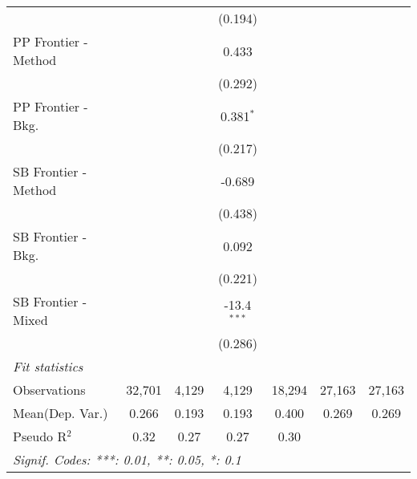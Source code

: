 \begin{tabular}{lcccccc}
                        &               &              & (0.194)       &               &        &   \\   
   PP Frontier - Method &               &              & 0.433         &               &        &   \\   
                        &               &              & (0.292)       &               &        &   \\   
   PP Frontier - Bkg.   &               &              & 0.381$^{*}$   &               &        &   \\   
                        &               &              & (0.217)       &               &        &   \\   
   SB Frontier - Method &               &              & -0.689        &               &        &   \\   
                        &               &              & (0.438)       &               &        &   \\   
   SB Frontier - Bkg.   &               &              & 0.092         &               &        &   \\   
                        &               &              & (0.221)       &               &        &   \\   
   SB Frontier - Mixed  &               &              & -13.4$^{***}$ &               &        &   \\   
                        &               &              & (0.286)       &               &        &   \\   
   \midrule
   \emph{Fit statistics}\\
   Observations         & 32,701        & 4,129        & 4,129         & 18,294        & 27,163 & 27,163\\  
Mean(Dep. Var.) & 0.266 & 0.193 & 0.193 & 0.400 & 0.269 & 0.269 \\
   Pseudo R$^2$         & 0.32          & 0.27         & 0.27          & 0.30          &        & \\  
   \midrule \midrule
   \multicolumn{7}{l}{\emph{Signif. Codes: ***: 0.01, **: 0.05, *: 0.1}}\\
\end{tabular}
\par\endgroup
